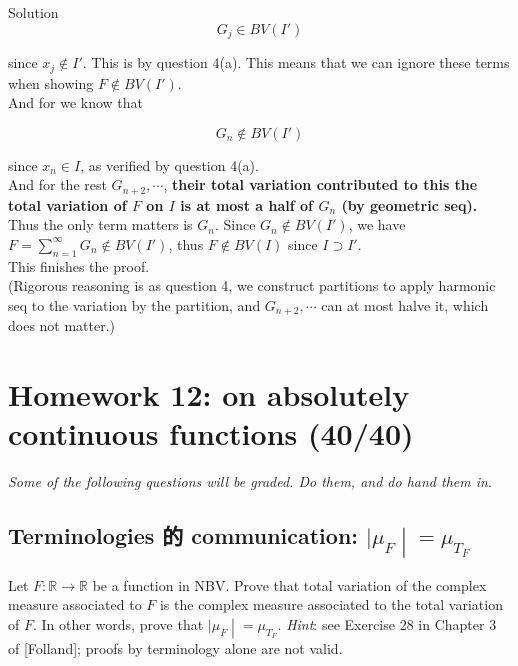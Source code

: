 \documentclass{qlnotes-export}
\begin{document}
\begin{qlsolution}{Solution}
\[G_{j} \in BV(I')\]

since \(x_{j} \notin I'\). This is by question 4(a). This means that we can ignore these terms when showing \(F \notin BV(I')\).\\
And for we know that

\[G_{n} \notin BV(I')\]

since \(x_{n} \in I\), as verified by question 4(a).\\
And for the rest \(G_{n + 2},\cdots\), \textbf{their total variation contributed to this the total variation of \(F\) on \(I\) is at most a half of \(G_{n}\) (by geometric seq).}\\
Thus the only term matters is \(G_{n}\). Since \(G_{n} \notin BV(I')\), we have \(F = \sum_{n = 1}^{\infty}G_{n} \notin BV(I')\), thus \(F \notin BV(I)\) since \(I \supset I'\).\\
This finishes the proof.\\
(Rigorous reasoning is as question 4, we construct partitions to apply harmonic seq to the variation by the partition, and \(G_{n + 2},\cdots\) can at most halve it, which does not matter.)

\end{qlsolution}

\chapter{Homework 12: on absolutely continuous functions (40/40)}\label{homework-12-on-absolutely-continuous-functions-4040}

\emph{Some of the following questions will be graded. Do them, and do hand them in}.

\section{\texorpdfstring{Terminologies 的 communication: \(\left. |\mu_{F} \middle| = \mu_{T_{F}} \right.\)}{Terminologies 的 communication: \textbackslash left. \textbar\textbackslash mu\_\{F\} \textbackslash middle\textbar{} = \textbackslash mu\_\{T\_\{F\}\} \textbackslash right.}}\label{terminologies-ux7684-communication-mu_fmu_t_f}

Let \(F:{\mathbb{R}}\rightarrow{\mathbb{R}}\) be a function in NBV. Prove that total variation of the complex measure associated to \(F\) is the complex measure associated to the total variation of \(F\). In other words, prove that \(\left. |\mu_{F} \middle| = \mu_{T_{F}} \right.\). \emph{Hint}: see Exercise 28 in Chapter 3 of {[}Folland{]}; proofs by terminology alone are not valid.
\end{document}
